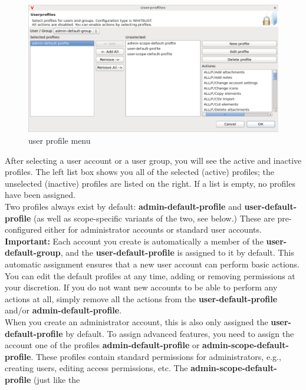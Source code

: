 \documentclass[a4paper,10pt]{book}
\begin{document}
\begin{figure}[htb!]
  \centering
  \includegraphics[scale=.38]{Screenshot/Benutzerprofile-en.png}
  \caption{\label{User profile menu} user profile menu}
\end{figure}
\newline
After selecting a user account or a user group, you will see the active and inactive profiles. The left list box
shows you all of the selected (active) profiles; the unselected (inactive) profiles are listed on the right. If a
list is empty, no profiles have been assigned.
\newline\\
Two profiles always exist by default: \textbf{admin-default-profile} and \textbf{user-default-profile}
(as well as scope-specific variants of the two, see below.) These are pre-configured either for administrator
accounts or standard user accounts.
\textbf{Important:} Each account you create is automatically a member of the \textbf{user-default-group}, and the
\textbf{user-default-profile} is assigned to it by default. This automatic assignment ensures that a new user
account can perform basic actions. You can edit the default profiles at any time, adding or removing permissions
at your discretion. If you do not want new accounts to be able to perform any actions at all, simply remove all
the actions from the \textbf{user-default-profile} and/or \textbf{admin-default-profile}.
\newline\\
When you create an administrator account, this is also only assigned the \textbf{user-default-profile} by default.
To assign advanced features, you need to assign the account one of the profiles \textbf{admin-default-profile} or
\textbf{admin-scope-default-profile}. These profiles contain standard permissions for administrators, e.g.,
creating users, editing access permissions, etc. The \textbf{admin-scope-default-profile} (just like the
\end{document}
